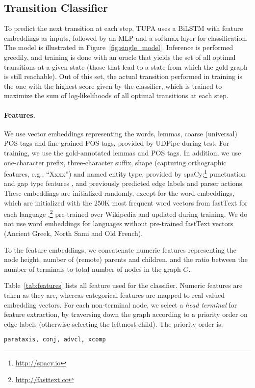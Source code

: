 \documentclass[11pt,a4paper]{article}
\begin{document}
\subsection{Transition Classifier}\label{sec:classifier}

To predict the next transition at each step,
TUPA uses a BiLSTM with feature embeddings as inputs,
followed by an MLP and a softmax layer for classification.
The model is illustrated in Figure~\ref{fig:single_model}.
Inference is performed greedily,
and training is done with an oracle that yields the set of all optimal 
transitions at a given state (those that lead to a state from which the gold graph is still reachable).
Out of this set, the actual transition performed in training is the one
with the highest score given by the classifier,
which is trained to maximize the sum of log-likelihoods of all 
optimal transitions at each step.




\paragraph{Features.}

We use vector embeddings
representing the words, lemmas, coarse (universal) POS tags and fine-grained POS tags,
provided by UDPipe during test.
For training, we use the gold-annotated lemmas and POS tags.
In addition, we use one-character prefix, three-character suffix,
shape (capturing orthographic features, e.g., ``Xxxx'') and named entity type,
provided by spaCy;\footnote{\url{http://spacy.io}}
punctuation and gap type features \cite{maier-lichte:2016:DiscoNLP},
and previously predicted edge labels and parser actions.
These embeddings are initialized randomly, except for the word embeddings,
which are initialized with the 250K most frequent word vectors from fastText
for each language
\cite{bojanowski2016enriching},\footnote{\url{http://fasttext.cc}}
pre-trained over Wikipedia and updated during training.
We do not use word embeddings for languages without pre-trained fastText vectors
(Ancient Greek, North Sami and Old French).

To the feature embeddings, we concatenate
numeric features representing the node height, number of (remote) parents and children,
and the ratio between the number of terminals to total number of nodes in the graph $G$.

Table~\ref{tab:features} lists all feature used for the classifier.
Numeric features are taken as they are, whereas categorical features are mapped to real-valued embedding
vectors.
For each non-terminal node,
we select a \textit{head terminal} for feature extraction,
by traversing down the graph according to
a priority order on edge labels (otherwise selecting the leftmost child).
The priority order is:
\begin{verbatim}
parataxis, conj, advcl, xcomp
\end{verbatim}
\end{document}
